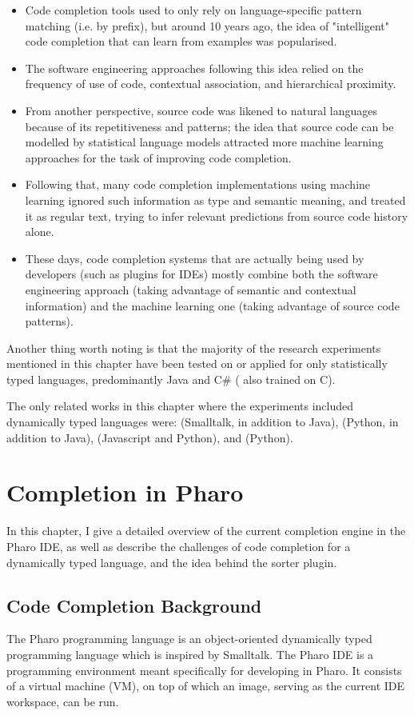 \documentclass[sigplan,screen]{acmart}
\begin{document}
\begin{itemize}
    \item Code completion tools used to only rely on language-specific pattern matching (i.e. by prefix), but around 10 years ago, the idea of "intelligent" code completion that can learn from examples was popularised.
    \item The software engineering approaches following this idea relied on the frequency of use of code, contextual association, and hierarchical proximity.
    \item From another perspective, source code was likened to natural languages because of its repetitiveness and patterns; the idea that source code can be modelled by statistical language models attracted more machine learning approaches for the task of improving code completion.
    \item Following that, many code completion implementations using machine learning ignored such information as type and semantic meaning, and treated it as regular text, trying to infer relevant predictions from source code history alone.
    \item These days, code completion systems that are actually being used by developers (such as plugins for IDEs) mostly combine both the software engineering approach (taking advantage of semantic and contextual information) and the machine learning one (taking advantage of source code patterns).
\end{itemize}

Another thing worth noting is that the majority of the research experiments mentioned in this chapter have been tested on or applied for only statistically typed languages, predominantly Java and C\# (\cite{Hind12a} also trained on C).

The only related works in this chapter where the experiments included dynamically typed languages were: \cite{Robb08a} (Smalltalk, in addition to Java), \cite{Tu14a} (Python, in addition to Java), \cite{Li17a} (Javascript and Python), and \cite{Svya19a} (Python).

\section{Completion in Pharo}
In this chapter, I give a detailed overview of the current completion engine in the Pharo IDE, as well as describe the challenges of code completion for a dynamically typed language, and the idea behind the sorter plugin.

\subsection{Code Completion Background}
The Pharo programming language is an object-oriented dynamically typed programming language which is inspired by Smalltalk. The Pharo IDE is a programming environment meant specifically for developing in Pharo. It consists of a virtual machine (VM), on top of which an image, serving as the current IDE workspace, can be run.
\end{document}
